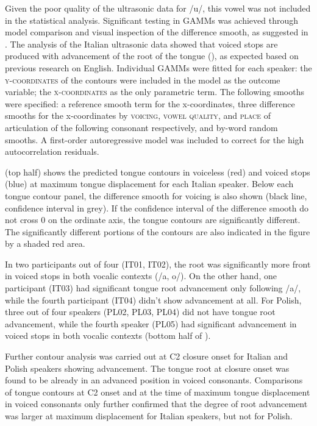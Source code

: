 \documentclass[authoryear, twocolumn]{elsarticle}
\begin{document}
Given the poor quality of the ultrasonic data for /u/, this vowel was
not included in the statistical analysis. Significant testing in GAMMs
was achieved through model comparison and visual inspection of the
difference smooth, as suggested in \citep{soskuthy2017}. The analysis of
the Italian ultrasonic data showed that voiced stops are produced with
advancement of the root of the tongue (), as expected based on previous
research on English. Individual GAMMs were fitted for each speaker: the
\textsc{y-coordinates} of the contours were included in the model as the
outcome variable; the \textsc{x-coordinates} as the only parametric
term. The following smooths were specified: a reference smooth term for
the x-coordinates, three difference smooths for the x-coordinates by
\textsc{voicing}, \textsc{vowel quality}, and \textsc{place} of
articulation of the following consonant respectively, and by-word random
smooths. A first-order autoregressive model was included to correct for
the high autocorrelation residuals.

 (top half) shows the predicted tongue contours in voiceless
(red) and voiced stops (blue) at maximum tongue displacement for each
Italian speaker. Below each tongue contour panel, the difference smooth
for voicing is also shown (black line, confidence interval in grey). If
the confidence interval of the difference smooth do not cross 0 on the
ordinate axis, the tongue contours are significantly different. The
significantly different portions of the contours are also indicated in
the figure by a shaded red area.

In two participants out of four (IT01, IT02), the root was significantly
more front in voiced stops in both vocalic contexts (/a, o/). On the
other hand, one participant (IT03) had significant tongue root
advancement only following /a/, while the fourth participant (IT04)
didn't show advancement at all. For Polish, three out of four speakers
(PL02, PL03, PL04) did not have tongue root advancement, while the
fourth speaker (PL05) had significant advancement in voiced stops in
both vocalic contexts (bottom half of ).

Further contour analysis was carried out at C2 closure onset for Italian
and Polish speakers showing advancement. The tongue root at closure
onset was found to be already in an advanced position in voiced
consonants. Comparisons of tongue contours at C2 onset and at the time
of maximum tongue displacement in voiced consonants only further
confirmed that the degree of root advancement was larger at maximum
displacement for Italian speakers, but not for Polish.
\end{document}
